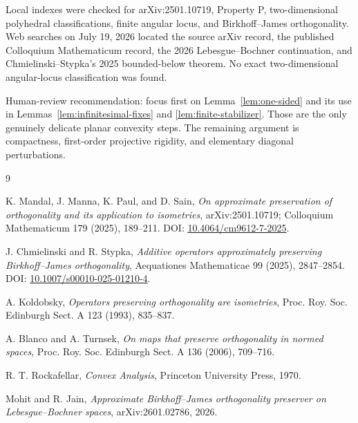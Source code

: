 \documentclass[11pt]{article}
\begin{document}
Local indexes were checked for arXiv:2501.10719, Property P, two-dimensional
polyhedral classifications, finite angular locus, and Birkhoff--James
orthogonality.  Web searches on July 19, 2026 located the source arXiv record,
the published Colloquium Mathematicum record, the 2026 Lebesgue--Bochner
continuation, and Chmielinski--Stypka's 2025 bounded-below theorem.  No exact
two-dimensional angular-locus classification was found.

Human-review recommendation: focus first on Lemma~\ref{lem:one-sided} and its
use in Lemmas~\ref{lem:infinitesimal-fixes} and \ref{lem:finite-stabilizer}.
Those are the only genuinely delicate planar convexity steps.  The remaining
argument is compactness, first-order projective rigidity, and elementary
diagonal perturbations.

\begin{thebibliography}{9}

K. Mandal, J. Manna, K. Paul, and D. Sain,
\emph{On approximate preservation of orthogonality and its application to
isometries}, arXiv:2501.10719; Colloquium Mathematicum 179 (2025), 189--211.
DOI: \href{https://doi.org/10.4064/cm9612-7-2025}{10.4064/cm9612-7-2025}.

J. Chmielinski and R. Stypka,
\emph{Additive operators approximately preserving Birkhoff--James
orthogonality}, Aequationes Mathematicae 99 (2025), 2847--2854.
DOI: \href{https://doi.org/10.1007/s00010-025-01210-4}{10.1007/s00010-025-01210-4}.

A. Koldobsky,
\emph{Operators preserving orthogonality are isometries}, Proc. Roy. Soc.
Edinburgh Sect. A 123 (1993), 835--837.

A. Blanco and A. Turnsek,
\emph{On maps that preserve orthogonality in normed spaces}, Proc. Roy. Soc.
Edinburgh Sect. A 136 (2006), 709--716.

R. T. Rockafellar,
\emph{Convex Analysis}, Princeton University Press, 1970.

Mohit and R. Jain,
\emph{Approximate Birkhoff--James orthogonality preserver on
Lebesgue--Bochner spaces}, arXiv:2601.02786, 2026.

\end{thebibliography}
\end{document}

